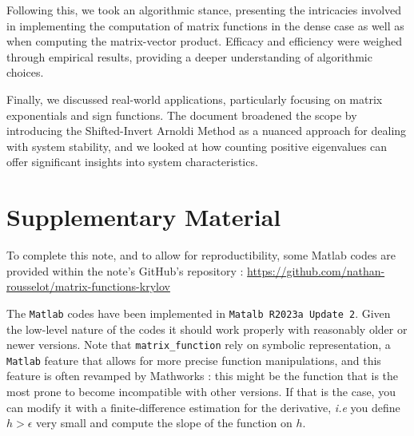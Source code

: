 \documentclass[11pt]{article}
\numberwithin{equation}{section}
\begin{document}
Following this, we took an algorithmic stance, presenting the intricacies involved in implementing the computation of matrix functions in the dense case as well as when computing the matrix-vector product. Efficacy and efficiency were weighed through empirical results, providing a deeper understanding of algorithmic choices.

Finally, we discussed real-world applications, particularly focusing on matrix exponentials and sign functions. The document broadened the scope by introducing the Shifted-Invert Arnoldi Method as a nuanced approach for dealing with system stability, and we looked at how counting positive eigenvalues can offer significant insights into system characteristics.

\printbibliography

\section*{Supplementary Material}

To complete this note, and to allow for reproductibility, some Matlab codes are provided within the note's GitHub's repository : \href{https://github.com/nathan-rousselot/matrix-functions-krylov}{https://github.com/nathan-rousselot/matrix-functions-krylov}

The \texttt{Matlab} codes have been implemented in \texttt{Matalb R2023a Update 2}. Given the low-level nature of the codes it should work properly with reasonably older or newer versions. Note that \texttt{matrix\_function} rely on symbolic representation, a \texttt{Matlab} feature that allows for more precise function manipulations, and this feature is often revamped by Mathworks : this might be the function that is the most prone to become incompatible with other versions. If that is the case, you can modify it with a finite-difference estimation for the derivative, \textit{i.e} you define $h>\epsilon$ very small and compute the slope of the function on $h$.
\end{document}
